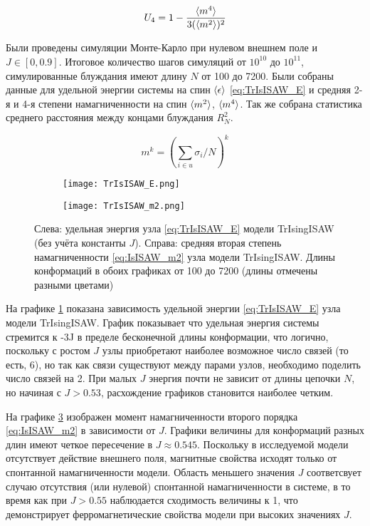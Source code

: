 \begin{equation}
\label{eq:IsISAW_U4}
	U_4 = 1 - \frac{\langle m^4 \rangle}{3 (\langle m^2 \rangle)^2}
\end{equation}


Были проведены симуляции Монте-Карло при нулевом внешнем поле и $J \in [0,0.9]$. 
Итоговое количество шагов симуляций от $10^10$ до $10^11$, симулированные блуждания имеют длину $N$ от 100 до 7200.
Были собраны данные для удельной энергии системы на спин $\langle \epsilon \rangle$ \eqref{eq:TrIsISAW_E} и средняя 2-я и 4-я степени намагниченности на спин $\langle m^2 \rangle$, $\langle m^4 \rangle$.
Так же собрана статистика среднего расстояния между концами блуждания $R^2_N$.

\begin{equation}
\label{eq:IsISAW_m2}
	m^{k} = (\sum_{i \in u} \sigma_i / N)^k
\end{equation}

\begin{figure}[h]
\begin{subfigure}{0.49\textwidth}
\texttt{[image: TrIsISAW\_E.png]}
\caption{}
\label{fig:TrIsISAW_E}
\end{subfigure}
\hfill
\begin{subfigure}{0.49\textwidth}
\texttt{[image: TrIsISAW\_m2.png]}
\caption{}
\label{fig:TrIsISAW_m2}
\end{subfigure}
\caption{Слева: удельная энергия узла \eqref{eq:TrIsISAW_E} модели TrIsingISAW (без учёта константы $J$).
Справа: средняя вторая степень намагниченности \eqref{eq:IsISAW_m2} узла модели TrIsingISAW. 
Длины конформаций в обоих графиках от 100 до 7200 (длины отмечены разными цветами)}

\end{figure}

На графике \ref{fig:TrIsISAW_E} показана зависимость удельной энергии \eqref{eq:TrIsISAW_E} узла модели TrIsingISAW.
График показывает что удельная энергия системы стремится к -3J в пределе бесконечной длины конформации, 
что логично, поскольку с ростом $J$ узлы приобретают наиболее возможное число связей (то есть, 6), но так как связи существуют между парами узлов,
необходимо поделить число связей на 2.
При малых $J$ энергия почти не зависит от длины цепочки $N$, но начиная с $J > 0.53$, расхождение графиков становится наиболее четким.

На графике \ref{fig:TrIsISAW_m2} изображен момент намагниченности второго порядка \eqref{eq:IsISAW_m2} в зависимости от $J$.
Графики величины для конформаций разных длин имеют четкое пересечение в $J \approx 0.545$.
Поскольку в исследуемой модели отсутствует действие внешнего поля, магнитные свойства исходят только от спонтанной намагниченности модели.
Область меньшего значения $J$ соответсвует случаю отсутствия (или нулевой) спонтанной намагниченности в системе,
в то время как при $J > 0.55$ наблюдается сходимость величины к 1, 
что демонстрирует ферромагнетические свойства модели при высоких значениях $J$.

